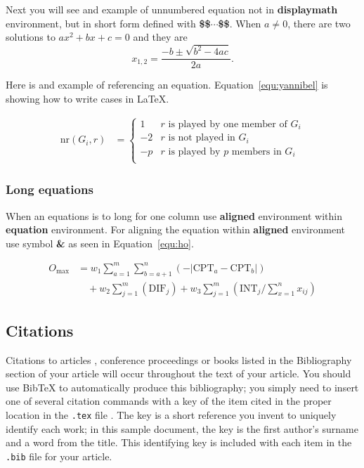 \documentclass[article,english]{stucosrec}
\newcommand{\latex}{\LaTeX\xspace}
\newcommand{\bibtex}{Bib\TeX\xspace}
\begin{document}
	Next you will see and example of unnumbered equation not in \textbf{displaymath} environment, but in short form defined with \textbf{\$\$$\cdots$\$\$}.
	When $a \ne 0$, there are two solutions to $ax^2 + bx + c = 0$ and they are $$x_{1, 2} = \frac{-b \pm \sqrt{b^2-4ac}}{2a}.$$
	
	Here is and example of referencing an equation. Equation~\ref{equ:yannibel} is showing how to write cases in \latex.
	
	\begin{equation}
		\begin{aligned} 
			\mathrm{nr}(G_i,r) & = \label{equ:yannibel}
			\begin{cases}
				1  & \text{$r$ is played by one member of $G_i$}\\
				-2 & \text{$r$ is not played in $G_i$} \\
				-p & \text{$r$ is played by $p$ members in $G_i$}\\
			\end{cases}
		\end{aligned}
	\end{equation}
	
	\subsubsection{Long equations}
	
	When an equations is to long for one column use \textbf{aligned} environment within \textbf{equation} environment.
	For aligning the equation within \textbf{aligned} environment use symbol \textbf{\&} as seen in Equation~\ref{equ:ho}.
	
	\begin{equation}
		\begin{aligned}
			O_{\max}& = w_1 \sum_{a=1}^{m} \sum_{b=a+1}^{n} (-\lvert\text{CPT}_a 
			-\text{CPT}_b\rvert)\\ 
			&\quad + w_2 \sum_{j=1}^{m} (\text{DIF}_j) + w_3 \sum_{j=1}^{m} 
			(\text{INT}_j/\sum_{x=1}^{n} x_{ij})
		\end{aligned}
		\label{equ:ho}
	\end{equation}
	
	\subsection{Citations}
	
	Citations to articles \cite{bowman:reasoning, clark:pct, braams:babel, herlihy:methodology}, conference proceedings \cite{clark:pct} or books \cite{salas:calculus, Lamport:LaTeX} listed
	in the Bibliography section of your article will occur throughout the text of your article.
	You should use \bibtex to automatically produce this bibliography; you simply need to insert one of several citation commands with a key of the item cited in the proper location in the \texttt{.tex} file \cite{Lamport:LaTeX}.
	The key is a short reference you invent to uniquely identify each work; in this sample document, the key is the first author's surname and a word from the title.
	This identifying key is included with each item in the \texttt{.bib} file for your article.
	
\end{document}
